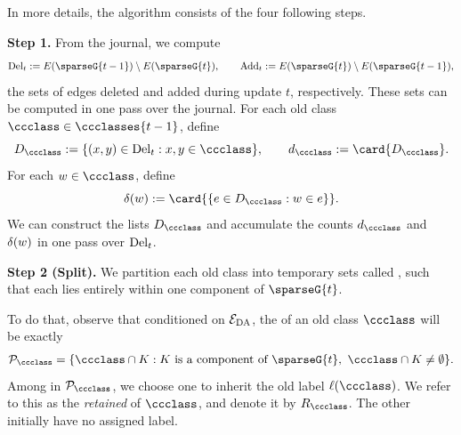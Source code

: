 In more details, the algorithm consists of the four following steps.

\noindent\textbf{Step 1.}
From the journal, we compute
\begin{align}
    \delt{t}:=E(\sparseG{t-1})\setminus E(\sparseG{t}), \nonumber
    \qquad
    \addt{t}:=E(\sparseG{t})\setminus E(\sparseG{t-1}), \nonumber
\end{align}
the sets of edges deleted and added during update $ t $, respectively.
These sets can be computed in one pass over the journal.
For each old class $ \ccclass\in\ccclasses{t-1} $, define
\[
    D_{\ccclass}:=\{(x,y) \in\delt{t}:x,y\in\ccclass\},
    \qquad d_{\ccclass}:=\card{D_{\ccclass}}.
\]
For each $ w\in\ccclass $, define
\[
    \delIncEdge{w}:=\card{\{e\in D_{\ccclass}:w\in e\}}.
\]
We can construct the lists $ D_{\ccclass} $ and accumulate the counts $ d_{\ccclass} $ and $ \delta(w) $ in one pass over $ \mathrm{Del}_{t} $. 

\noindent\textbf{Step 2 (Split).}
We partition each old class into temporary sets called \emph{}, such that each \piece{} lies entirely within one component of $ \sparseG{t} $.

To do that, observe that conditioned on $ \mathcal{E}_{\rm DA} $, the  of an old class $ \ccclass $ will be exactly
\begin{align}
    \mathcal P_{\ccclass}
    =\{\ccclass\cap K:K\text{ is a component of }\sparseG{t},\ \ccclass\cap K\ne\emptyset\}. \nonumber
\end{align}
Among  in $ \mathcal P_{\ccclass} $, we choose one \piece{} to inherit the old label $ \ell(\ccclass) $. We refer to this \piece{} as the \emph{retained \piece{}} of $ \ccclass $, and denote it by $ \retainedPieces{\ccclass} $.
The other  initially have no assigned label.

